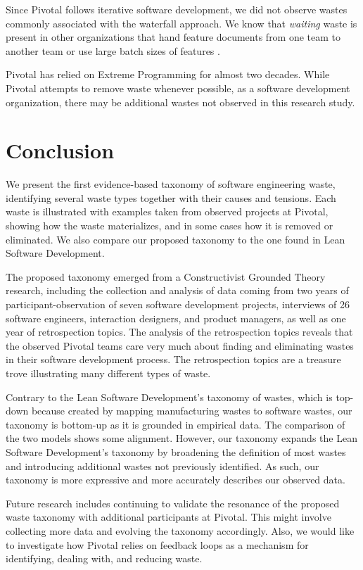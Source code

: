 Since Pivotal follows iterative software development, we did not observe wastes commonly associated with the waterfall approach. We know that \textit{waiting} waste is present in other organizations that hand feature documents from one team to another team or use large batch sizes of features \cite{Ali2016, Khurum2014, Mujtaba2010}.

Pivotal has relied on Extreme Programming for almost two decades. While Pivotal attempts to remove waste whenever possible, as a  software development organization, there may be additional wastes not observed in this research study. 
\section{Conclusion}
\label{Conclusion}
We present the first evidence-based taxonomy of software engineering waste, identifying several waste types together with their causes and tensions. Each waste is illustrated with examples taken from observed projects at Pivotal, showing how the waste materializes, and in some cases how it is removed or eliminated. We also compare our proposed taxonomy to the one found in Lean Software Development.

The proposed taxonomy emerged from a Constructivist Grounded Theory research, including the collection and analysis of data coming from two years of participant-observation of seven software development projects, interviews of 26 software engineers, interaction designers, and product managers, as well as one year of retrospection topics. The analysis of the retrospection topics reveals that the observed Pivotal teams care very much about finding and eliminating wastes in their software development process. The retrospection topics are a treasure trove illustrating many different types of waste. 

Contrary to the Lean Software Development's taxonomy of wastes, which is top-down because created by mapping manufacturing wastes to software wastes, our taxonomy is bottom-up as it is grounded in empirical data. The comparison of the two models shows some alignment. However, our taxonomy expands the Lean Software Development's taxonomy by broadening the definition of most wastes and introducing additional wastes not previously identified. As such, our taxonomy is more expressive and more accurately describes our observed data.

Future research includes continuing to validate the resonance of the proposed waste taxonomy with additional participants at Pivotal. This might involve collecting more data and evolving the taxonomy accordingly. Also, we would like to investigate how Pivotal relies on feedback loops as a mechanism for identifying, dealing with, and reducing waste. 

